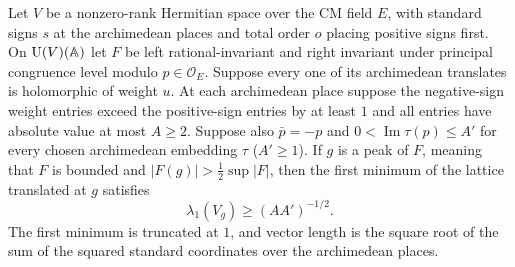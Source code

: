 \begin{lemma}
\label{lem:c-peak-first-minimum}
\emitthmsource
Let $V$ be a nonzero-rank Hermitian space over the CM field $E$, with standard signs $s$ at the archimedean places and total order $o$ placing positive signs first. On $\operatorname{U}(V)(\mathbb A)$ let $F$ be left rational-invariant and right invariant under principal congruence level modulo $p\in\mathcal O_E$. Suppose every one of its archimedean translates is holomorphic of weight $u$. At each archimedean place suppose the negative-sign weight entries exceed the positive-sign entries by at least $1$ and all entries have absolute value at most $A\ge2$. Suppose also $\bar p=-p$ and $0<\operatorname{Im}\tau(p)\le A'$ for every chosen archimedean embedding $\tau$ ($A'\ge1$). If $g$ is a peak of $F$, meaning that $F$ is bounded and $|F(g)|>\tfrac12\sup|F|$, then the first minimum of the lattice translated at $g$ satisfies
\[
       \lambda_1(V_g)\ge(AA')^{-1/2}.
\]
The first minimum is truncated at $1$, and vector length is the square root of the sum of the squared standard coordinates over the archimedean places.
\end{lemma}

